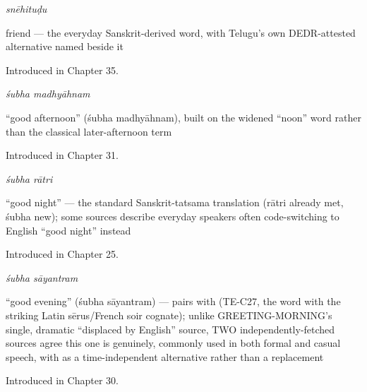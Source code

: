 \noindent\begin{minipage}[t]{\linewidth}
\raggedright
\textbf{}\enspace\emph{snēhituḍu}\par
\small friend — the everyday Sanskrit-derived word, with Telugu's own DEDR-attested alternative named beside it\par
\footnotesize Introduced in Chapter 35.
\end{minipage}\par\medskip

\noindent\begin{minipage}[t]{\linewidth}
\raggedright
\textbf{ }\enspace\emph{śubha madhyāhnam}\par
\small \textquotedblleft{}good afternoon\textquotedblright{} (śubha madhyāhnam), built on the widened \textquotedblleft{}noon\textquotedblright{} word rather than the classical later-afternoon term\par
\footnotesize Introduced in Chapter 31.
\end{minipage}\par\medskip

\noindent\begin{minipage}[t]{\linewidth}
\raggedright
\textbf{ }\enspace\emph{śubha rātri}\par
\small \textquotedblleft{}good night\textquotedblright{} — the standard Sanskrit-tatsama translation (rātri already met, śubha new); some sources describe everyday speakers often code-switching to English \textquotedblleft{}good night\textquotedblright{} instead\par
\footnotesize Introduced in Chapter 25.
\end{minipage}\par\medskip

\noindent\begin{minipage}[t]{\linewidth}
\raggedright
\textbf{ }\enspace\emph{śubha sāyantram}\par
\small \textquotedblleft{}good evening\textquotedblright{} (śubha sāyantram) — pairs with  (TE-C27, the word with the striking Latin sērus/French soir cognate); unlike GREETING-MORNING's single, dramatic \textquotedblleft{}displaced by English\textquotedblright{} source, TWO independently-fetched sources agree this one is genuinely, commonly used in both formal and casual speech, with  as a time-independent alternative rather than a replacement\par
\footnotesize Introduced in Chapter 30.
\end{minipage}\par\medskip

